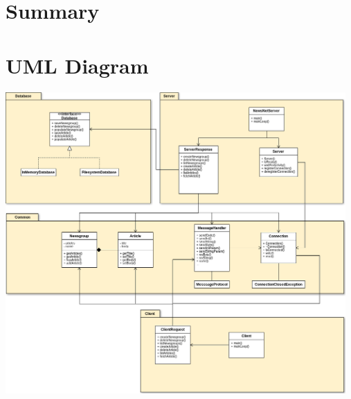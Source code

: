 \documentclass[a4paper, titlepage]{article}
\begin{document}
\section{Summary}\label{summary}

\newpage
\appendix
\section{UML Diagram}\label{App:AppendixA}
\includegraphics[width=130mm]{NewsNet_UML.png}
\end{document}

